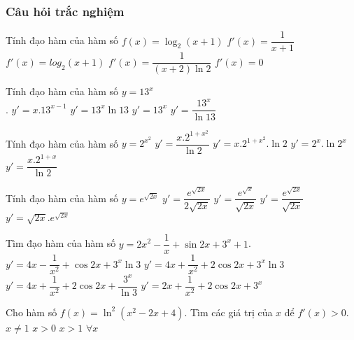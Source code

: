 \subsubsection{Câu hỏi trắc nghiệm}
\begin{ex}%
	Tính đạo hàm của hàm số $f(x)=\log_2(x+1)$ 
	\choice
	{$f'(x)=\dfrac{1}{x+1}$}
	{$f'(x)=log_2(x+1)$}
	{\True $f'(x)=\dfrac{1}{(x+2)\ln2}$}
	{$f'(x)=0$}
\end{ex}
\begin{ex}%
	Tính đạo hàm của hàm số $y=13^x$\\. 
	\choice
	{$y'=x.13^{x-1}$}
	{\True $y'=13^{x}\ln 13$}
	{$y'=13^x$}
	{$y'=\dfrac{13^x}{\ln13}$}
\end{ex}
\begin{ex}%
	Tính đạo hàm của hàm số $y=2^{x^2}$
	\choice
	{$y'=\dfrac{x.2^{1+x^2}}{\ln2}$}
	{\True $y'=x.2^{1+x^2}.\ln2$}
	{$y'=2^x.\ln2^x$}
	{$y'=\dfrac{x.2^{1+x}}{\ln2}$}
\end{ex}
\begin{ex}%
	Tính đạo hàm của hàm số $y=e^{\sqrt{2x}}$
	\choice
	{\True $y'=\dfrac{e^{\sqrt{2x}}}{2\sqrt{2x}}$}
	{$y'=\dfrac{e^{\sqrt{x}}}{\sqrt{2x}}$}
	{$y'=\dfrac{e^{\sqrt{2x}}}{\sqrt{2x}}$}
	{$y'=\sqrt{2x}.e^{\sqrt{2x}}$}
\end{ex}
\begin{ex}%
	Tìm đạo hàm của hàm số $y=2x^2-\dfrac{1}{x}+\sin 2x+3^x+1$. 
	\choice
	{$y'=4x-\dfrac{1}{x^2}+\cos 2x+3^x\ln 3$}
	{\True $y'=4x+\dfrac{1}{x^2}+2\cos 2x+3^x\ln 3$}
	{$y'=4x+\dfrac{1}{x^2}+2\cos 2x+\dfrac{3^x}{\ln 3}$}
	{$y'=2x+\dfrac{1}{x^2}+2\cos 2x+3^x$}
\end{ex}
\begin{ex}%
	Cho hàm số $f(x)=\ln^2\left(x^2-2x+4\right)$. Tìm các giá trị của $x$ để $f'(x)>0$. 
	\choice
	{$x\neq 1$}
	{$x>0$}
	{\True $x>1$}
	{$\forall x$}
\end{ex}
